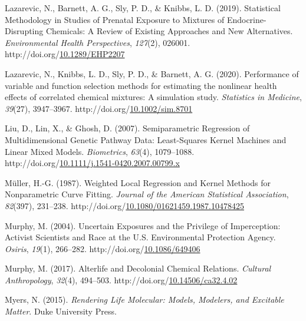 \documentclass[12pt, twoside]{amherstthesis}
\newenvironment{CSLReferences}[2]%
  {}%
  {\par}
\begin{document}
\begin{CSLReferences}{1}{0}
\leavevmode{}%
Lazarevic, N., Barnett, A. G., Sly, P. D., \& Knibbs, L. D. (2019). Statistical {Methodology} in {Studies} of {Prenatal} {Exposure} to {Mixtures} of {Endocrine}-{Disrupting} {Chemicals}: {A} {Review} of {Existing} {Approaches} and {New} {Alternatives}. \emph{Environmental Health Perspectives}, \emph{127}(2), 026001. http://doi.org/\href{https://doi.org/10.1289/EHP2207}{10.1289/EHP2207}

\leavevmode{}%
Lazarevic, N., Knibbs, L. D., Sly, P. D., \& Barnett, A. G. (2020). Performance of variable and function selection methods for estimating the nonlinear health effects of correlated chemical mixtures: {A} simulation study. \emph{Statistics in Medicine}, \emph{39}(27), 3947--3967. http://doi.org/\href{https://doi.org/10.1002/sim.8701}{10.1002/sim.8701}

\leavevmode{}%
Liu, D., Lin, X., \& Ghosh, D. (2007). Semiparametric {Regression} of {Multidimensional} {Genetic} {Pathway} {Data}: {Least}-{Squares} {Kernel} {Machines} and {Linear} {Mixed} {Models}. \emph{Biometrics}, \emph{63}(4), 1079--1088. http://doi.org/\href{https://doi.org/10.1111/j.1541-0420.2007.00799.x}{10.1111/j.1541-0420.2007.00799.x}

\leavevmode{}%
Müller, H.-G. (1987). Weighted {Local} {Regression} and {Kernel} {Methods} for {Nonparametric} {Curve} {Fitting}. \emph{Journal of the American Statistical Association}, \emph{82}(397), 231--238. http://doi.org/\href{https://doi.org/10.1080/01621459.1987.10478425}{10.1080/01621459.1987.10478425}

\leavevmode{}%
Murphy, M. (2004). Uncertain {Exposures} and the {Privilege} of {Imperception}: {Activist} {Scientists} and {Race} at the {U}.{S}. {Environmental} {Protection} {Agency}. \emph{Osiris}, \emph{19}(1), 266--282. http://doi.org/\href{https://doi.org/10.1086/649406}{10.1086/649406}

\leavevmode{}%
Murphy, M. (2017). Alterlife and {Decolonial} {Chemical} {Relations}. \emph{Cultural Anthropology}, \emph{32}(4), 494--503. http://doi.org/\href{https://doi.org/10.14506/ca32.4.02}{10.14506/ca32.4.02}

\leavevmode{}%
Myers, N. (2015). \emph{Rendering {Life} {Molecular}: {Models}, {Modelers}, and {Excitable} {Matter}}. Duke University Press.


\end{CSLReferences}
\end{document}
